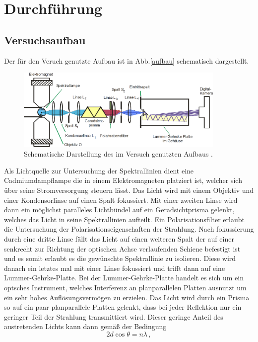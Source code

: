 \section{Durchführung}
\subsection{Versuchsaufbau}
Der für den Veruch genutzte Aufbau ist in Abb.\ref{aufbau} schematisch dargestellt.
\begin{figure}
  \centering
  \includegraphics[width=0.9\textwidth]{Bilder/aufbau.png}
  \caption{Schematische Darstellung des im Versuch genutzten Aufbaus \cite{anleitung}.}
\end{figure}
Als Lichtquelle zur Untersuchung der Spektrallinien dient eine Cadmiumdampflampe die in einem Elektromagneten platziert ist, welcher sich über seine Stromversorgung steuern lässt. Das Licht wird mit einem Objektiv und einer Kondensorlinse auf einen Spalt fokussiert. Mit einer zweiten Linse wird dann ein möglichst paralleles Lichtbündel auf ein Geradsichtprisma gelenkt, welches das Licht in seine Spektrallinien aufteilt. Ein Polarisationsfilter erlaubt die Untersuchung der Polarisationseigenschaften der Strahlung. Nach fokussierung durch eine dritte Linse fällt das Licht auf einen weiteren Spalt der auf einer senkrecht zur Richtung der optischen Achse verlaufenden Schiene befestigt ist und es somit erlaubt es die gewünschte Spektrallinie zu isolieren. Diese wird danach ein letztes mal mit einer Linse fokussiert und trifft dann auf eine Lummer-Gehrke-Platte.
Bei der Lummer-Gehrke-Platte handelt es sich um ein optsches Instrument, welches Interferenz an planparallelen Platten ausnutzt um ein sehr hohes Auflösungsvermögen zu erzielen. Das Licht wird durch ein Prisma so auf ein paar planparallele Platten gelenkt, dass bei jeder Reflektion nur ein geringer Teil der Strahlung transmittiert wird. Dieser geringe Anteil des austretenden Lichts kann dann gemäß der Bedingung
\begin{equation}
2d\cos{\theta}=n\lambda\,,
\end{equation}
